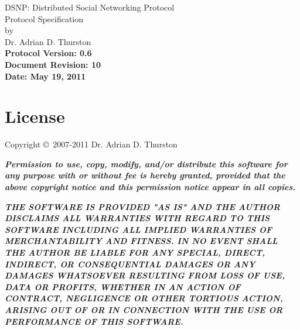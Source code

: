 \documentclass[letterpaper,11pt,oneside]{article}
\begin{document}
%
%

\thispagestyle{empty}
\begin{center}
{\huge DSNP: Distributed Social Networking Protocol}\\
\vspace*{12pt}
{\Large Protocol Specification}\\
\vspace{12pt}
by\\
\vspace{12pt}
{\large Dr. Adrian D. Thurston}\\
\vspace{22pt}
{\noindent\bf\large Protocol Version: 0.6}\\
\vspace{6pt}
{\noindent\bf\large Document Revision: 10}\\
\vspace{6pt}
{\noindent\bf\large Date: May 19, 2011}
\end{center}


\vspace{1.3in}

\section*{License}

Copyright \copyright\ 2007-2011 Dr. Adrian D. Thurston

\vspace{5pt}

{\bf\it\noindent Permission to use, copy, modify, and/or distribute this
software for any purpose with or without fee is hereby granted, provided that
the above copyright notice and this permission notice appear in all copies.}

\vspace{5pt}

{\bf\it\noindent
THE SOFTWARE IS PROVIDED "AS IS" AND THE AUTHOR DISCLAIMS ALL WARRANTIES
WITH REGARD TO THIS SOFTWARE INCLUDING ALL IMPLIED WARRANTIES OF
MERCHANTABILITY AND FITNESS. IN NO EVENT SHALL THE AUTHOR BE LIABLE FOR
ANY SPECIAL, DIRECT, INDIRECT, OR CONSEQUENTIAL DAMAGES OR ANY DAMAGES
WHATSOEVER RESULTING FROM LOSS OF USE, DATA OR PROFITS, WHETHER IN AN
ACTION OF CONTRACT, NEGLIGENCE OR OTHER TORTIOUS ACTION, ARISING OUT OF
OR IN CONNECTION WITH THE USE OR PERFORMANCE OF THIS SOFTWARE.}

\vspace{1.5in}
\end{document}
